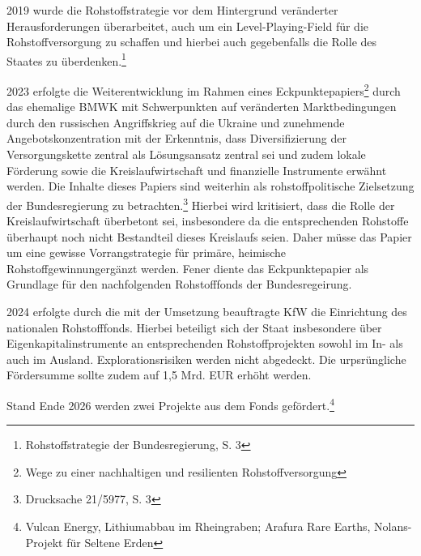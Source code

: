 \documentclass[12pt,a4paper,oneside]{book} %
\begin{document}
2019 wurde die Rohstoffstrategie vor dem Hintergrund veränderter Herausforderungen überarbeitet, auch um ein Level-Playing-Field für die Rohstoffversorgung zu schaffen und hierbei auch \glqq gegebenfalls die Rolle des Staates zu überdenken\grqq.\footnote{Rohstoffstrategie der Bundesregierung, S. 3}

2023 erfolgte die Weiterentwicklung im Rahmen eines Eckpunktepapiers\footnote{Wege zu einer nachhaltigen und resilienten Rohstoffversorgung} durch das ehemalige BMWK mit Schwerpunkten auf veränderten Marktbedingungen durch den russischen Angriffskrieg auf die Ukraine und zunehmende Angebotskonzentration mit der Erkenntnis, dass Diversifizierung der Versorgungskette zentral als Lösungsansatz zentral sei und zudem lokale Förderung sowie die Kreislaufwirtschaft und finanzielle Instrumente erwähnt werden. Die Inhalte dieses Papiers sind weiterhin als rohstoffpolitische Zielsetzung der Bundesregierung zu betrachten.\footnote{Drucksache 21/5977, S. 3} Hierbei wird kritisiert, dass die Rolle der Kreislaufwirtschaft überbetont sei, insbesondere da die entsprechenden Rohstoffe überhaupt noch nicht Bestandteil dieses Kreislaufs seien.\autocite{Frenz 2025, S. 313} Daher müsse das Papier um eine gewisse \glqq Vorrangstrategie für primäre, heimische Rohstoffgewinnung\grqq ergänzt werden.\autocite{Frenz 2025, S. 313} Fener diente das Eckpunktepapier als Grundlage für den nachfolgenden Rohstofffonds der Bundesregeirung.

2024 erfolgte durch die mit der Umsetzung beauftragte KfW die Einrichtung des nationalen Rohstofffonds. Hierbei beteiligt sich der Staat insbesondere über Eigenkapitalinstrumente an entsprechenden Rohstoffprojekten sowohl im In- als auch im Ausland. Explorationsrisiken werden nicht abgedeckt. Die urpsrüngliche Fördersumme sollte zudem auf 1,5 Mrd. EUR erhöht werden.\autocite{https://www.handelsblatt.com/politik/deutschland/industriepolitik-berlin-stockt-rohstofffonds-auf-15-milliarden-euro-auf/100236573.html} 

Stand Ende 2026 werden zwei Projekte aus dem Fonds gefördert.\footnote{Vulcan Energy, Lithiumabbau im Rheingraben; Arafura Rare Earths, Nolans-Projekt für Seltene Erden}
\end{document}
